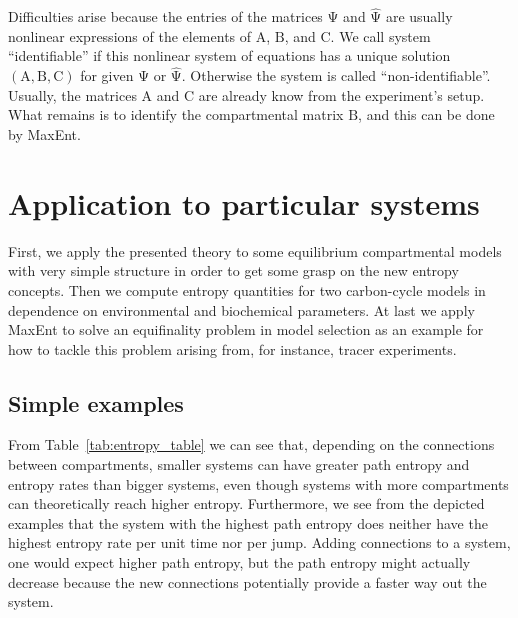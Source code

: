 \documentclass[smallextended]{svjour3}
\makeatletter
\renewcommand*{\eqref}[1]{%
  \hyperref[{#1}]{\textup{\tagform@{\ref*{#1}}}}%
}
\renewcommand{\tens}[1]{\mathrm{#1}}
\renewcommand{\emph}[1]{``#1''}
\makeatother
\begin{document}
Difficulties arise because the entries of the matrices $\tens{\Psi}$ and $\widehat{\tens{\Psi}}$ are usually nonlinear expressions of the elements of $\tens{A}$, $\tens{B}$, and $\tens{C}$.
We call system~\eqref{eqn:ABC_system} \emph{identifiable} if this nonlinear system of equations has a unique solution $(\tens{A},\tens{B},\tens{C})$ for given $\tens{\Psi}$ or $\widehat{\tens{\Psi}}$.
Otherwise the system is called \emph{non-identifiable}.
Usually, the matrices $\tens{A}$ and $\tens{C}$ are already know from the experiment's setup.
What remains is to identify the compartmental matrix $\tens{B}$, and this can be done by MaxEnt.

 
\section{Application to particular systems}
First, we apply the presented theory to some equilibrium compartmental models with very simple structure in order to get some grasp on the new entropy concepts.
Then we compute entropy quantities for two carbon-cycle models in dependence on environmental and biochemical parameters.
At last we apply MaxEnt to solve an equifinality problem in model selection as an example for how to tackle this problem arising from, for instance, tracer experiments.


\subsection{Simple examples}
\label{sec:simple_examples}
From Table~\ref{tab:entropy_table} we can see that, depending on the connections between compartments, smaller systems can have greater path entropy and entropy rates than bigger systems, even though systems with more compartments can theoretically reach higher entropy.
Furthermore, we see from the depicted examples that the system with the highest path entropy does neither have the highest entropy rate per unit time nor per jump.
Adding connections to a system, one would expect higher path entropy, but the path entropy might actually decrease because the new connections potentially provide a faster way out the system.
\end{document}
